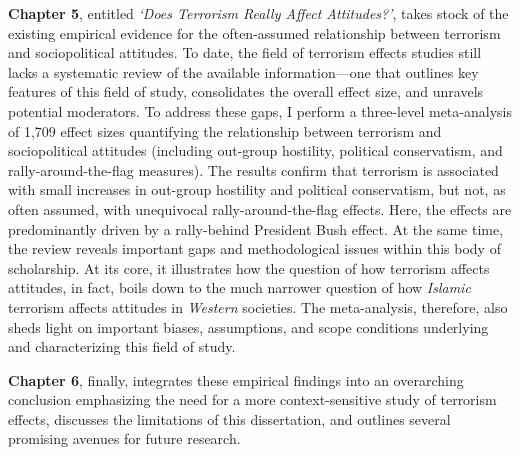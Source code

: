 \textbf{Chapter 5}, entitled \textit{`Does Terrorism Really Affect Attitudes?'}, takes stock of the existing empirical evidence for the often-assumed relationship between terrorism and sociopolitical attitudes. To date, the field of terrorism effects studies still lacks a systematic review of the available information---one that outlines key features of this field of study, consolidates the overall effect size, and unravels potential moderators. To address these gaps, I perform a three-level meta-analysis of 1,709 effect sizes quantifying the relationship between terrorism and sociopolitical attitudes (including out-group hostility, political conservatism, and rally-around-the-flag measures). The results confirm that terrorism is associated with small increases in out-group hostility and political conservatism, but not, as often assumed, with unequivocal rally-around-the-flag effects. Here, the effects are predominantly driven by a rally-behind President Bush effect. At the same time, the review reveals important gaps and methodological issues within this body of scholarship. At its core, it illustrates how the question of how terrorism affects attitudes, in fact, boils down to the much narrower question of how \textit{Islamic} terrorism affects attitudes in \textit{Western} societies. The meta-analysis, therefore, also sheds light on important biases, assumptions, and scope conditions underlying and characterizing this field of study. %

\textbf{Chapter 6}, finally, integrates these empirical findings into an overarching conclusion emphasizing the need for a more context-sensitive study of terrorism effects, discusses the limitations of this dissertation, and outlines several promising avenues for future research.

